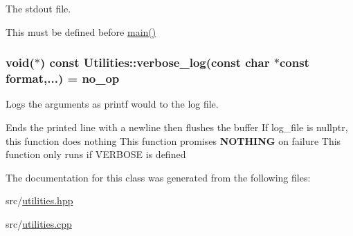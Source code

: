 The stdout file. 

This must be defined before \hyperlink{shadow__stack_8cpp_a0ddf1224851353fc92bfbff6f499fa97}{main()} 
\subsubsection[{\texorpdfstring{verbose\+\_\+log}{verbose_log}}]{\setlength{\rightskip}{0pt plus 5cm}void($\ast$) const Utilities\+::verbose\+\_\+log(const char $\ast$const format,...) = {\bf no\+\_\+op}\hspace{0.3cm}{\ttfamily [static]}}\hypertarget{class_utilities_aea2455488648f9acb6f72dea878b3782}{}\label{class_utilities_aea2455488648f9acb6f72dea878b3782}


Logs the arguments as printf would to the log file. 

Ends the printed line with a newline then flushes the buffer If log\+\_\+file is nullptr, this function does nothing This function promises {\bfseries N\+O\+T\+H\+I\+NG} on failure This function only runs if V\+E\+R\+B\+O\+SE is defined 

The documentation for this class was generated from the following files\+:\begin{DoxyCompactItemize}
\item 
src/\hyperlink{utilities_8hpp}{utilities.\+hpp}\item 
src/\hyperlink{utilities_8cpp}{utilities.\+cpp}\end{DoxyCompactItemize}
